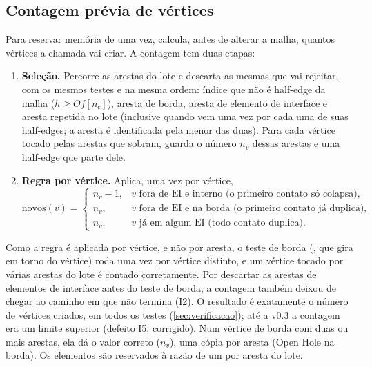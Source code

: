 \subsection{Contagem prévia de vértices}
\label{sec:contagem}

Para reservar memória de uma vez,  calcula, antes de alterar a malha, quantos vértices
a chamada vai criar. A contagem tem duas etapas:
\begin{enumerate}
\item \textbf{Seleção.} Percorre as arestas do lote e descarta as mesmas que  vai
rejeitar, com os mesmos testes e na mesma ordem: índice que não é half-edge da malha ($h\ge Of[n_c]$), aresta de borda,
aresta de elemento de interface e aresta repetida no lote (inclusive quando vem uma vez por cada uma de suas
half-edges; a aresta é identificada pela menor das duas). Para cada vértice tocado pelas arestas que sobram, guarda o
número $n_v$ dessas arestas e uma half-edge que parte dele.
\item \textbf{Regra por vértice.} Aplica, uma vez por vértice,
\[
\text{novos}(v)=
\begin{cases}
n_v-1, & v \text{ fora de EI e interno (o primeiro contato só colapsa)},\\
n_v, & v \text{ fora de EI e na borda (o primeiro contato já duplica)},\\
n_v, & v \text{ já em algum EI (todo contato duplica)}.
\end{cases}
\]
\end{enumerate}
Como a regra é aplicada por vértice, e não por aresta, o teste de borda (, que gira em torno do vértice)
roda uma vez por vértice distinto, e um vértice tocado por várias arestas do lote é contado corretamente. Por descartar
as arestas de elementos de interface antes do teste de borda, a contagem também deixou de chegar ao caminho em que
 não termina (I2). O resultado é exatamente o número de vértices criados, em todos os testes
(\cref{sec:verificacao}); até a v0.3 a contagem era um limite superior (defeito I5, corrigido). Num vértice de borda com
duas ou mais arestas, ela dá o valor correto ($n_v$), uma cópia por aresta (Open Hole na borda). Os elementos
são reservados à razão de um por aresta do lote.
